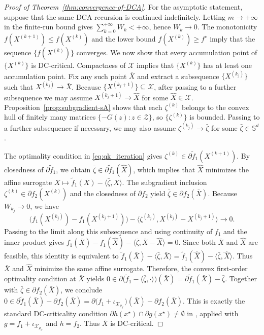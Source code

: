 \documentclass[11pt, letterpaper, oneside, reqno]{amsart}
\newcommand{\opt}{^\star}
\newcommand{\inner}[2]{\big \langle #1, #2 \big \rangle }
\begin{document}
\begin{proof}[Proof of Theorem~\ref{thm:convergence-of-DCA}]
For the asymptotic statement, suppose that the same DCA recursion is continued indefinitely. Letting $m\to+\infty$ in the finite-run bound gives $\sum_{k=0}^{+\infty} W_k < +\infty$, hence $W_k \to 0$.
The monotonicity $f(X^{(k+1)})\le f(X^{(k)})$ and the lower bound $f(X^{(k)})\ge f\opt$ imply that the sequence $\{f(X^{(k)})\}$ converges.
We now show that every accumulation point of $\{X^{(k)}\}$ is DC-critical. Compactness of $\mathcal X$ implies that $\{X^{(k)}\}$ has at least one accumulation point. Fix any such point $\bar X$ and extract a subsequence $\{X^{(k_j)}\}$ such that $X^{(k_j)} \to \bar X$.
Because $\{X^{(k_j+1)}\} \subseteq \mathcal X$, after passing to a further subsequence we may assume
$X^{(k_j+1)} \to \hat X$ for some $\hat X \in \mathcal X$.
Proposition~\ref{prop:subgradient-sA} shows that each $\zeta^{(k)}$ belongs to the convex hull of finitely many matrices $\{-G(z) : z \in \mathcal Z\}$, so $\{\zeta^{(k)}\}$ is bounded. Passing to a further subsequence if necessary, we may also assume
$\zeta^{(k_j)} \to \bar \zeta$ for some $\bar \zeta \in \mathbb S^d$.

The optimality condition in \eqref{eq:qk_iteration} gives $\zeta^{(k)} \in \partial \tilde f_1(X^{(k+1)})$.
By closedness of $\partial \tilde f_1$, we obtain $\bar \zeta \in \partial \tilde f_1(\hat X)$, which implies that $\hat X$ minimizes the affine surrogate $X \mapsto \tilde f_1(X) - \inner{\bar \zeta}{X}$.
The subgradient inclusion $\zeta^{(k)} \in \partial f_2(X^{(k)})$ and the closedness of $\partial f_2$ yield $\bar \zeta \in \partial f_2(\bar X)$.
Because $W_{k_j} \to 0$, we have
\[
\bigl(f_1(X^{(k_j)}) - f_1(X^{(k_j+1)})\bigr) - \inner{\zeta^{(k_j)}}{X^{(k_j)} - X^{(k_j+1)}}
\to 0.
\]
Passing to the limit along this subsequence and using continuity of $f_1$ and the inner product gives
$f_1(\bar X) - f_1(\hat X) - \inner{\bar \zeta}{\bar X - \hat X} = 0$.
Since both $\bar X$ and $\hat X$ are feasible, this identity is equivalent to
$\tilde f_1(\bar X) - \inner{\bar \zeta}{\bar X}
= \tilde f_1(\hat X) - \inner{\bar \zeta}{\hat X}$.
Thus $\bar X$ and $\hat X$ minimize the same affine surrogate.
Therefore, the convex first-order optimality condition at $\bar X$ yields
$0 \in \partial\bigl(\tilde f_1 - \inner{\bar \zeta}{\cdot}\bigr)(\bar X)
= \partial \tilde f_1(\bar X) - \bar \zeta$.
Together with $\bar \zeta \in \partial f_2(\bar X)$, we conclude
$0 \in \partial \tilde f_1(\bar X) - \partial f_2(\bar X)
= \partial\bigl(f_1 + \iota_{\mathcal X_{\rho_{\mathcal T}}}\bigr)(\bar X) - \partial f_2(\bar X)$.
This is exactly the standard DC-criticality condition $\partial h(x\opt)\cap \partial g(x\opt)\neq\emptyset$ in \cite[Section~1]{ref:le2014dc}, applied with $g = f_1 + \iota_{\mathcal X_{\rho_{\mathcal T}}}$ and $h = f_2$. Thus $\bar X$ is DC-critical.
\end{proof}
\end{document}
